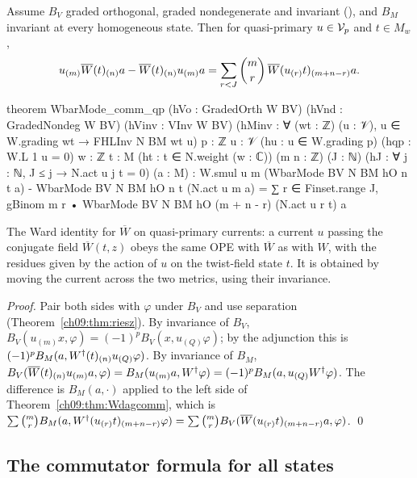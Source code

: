 \begin{theorem}\label{ch09:thm:Wbarcommqp}
Assume $B_V$ graded orthogonal, graded nondegenerate and invariant (), and $B_M$
invariant at every homogeneous state. Then for quasi-primary $u\in\mathcal{V}_p$ and $t\in M_w$,
\begin{equation*}
u_{(m)}\overline{W}(t)_{(n)}a-\overline{W}(t)_{(n)}u_{(m)}a=\sum_{r<J}\binom mr\,\overline{W}(u_{(r)}t)_{(m+n-r)}a .
\end{equation*}
\end{theorem}
\begin{leancode}
theorem WbarMode_comm_qp (hVo : GradedOrth W BV) (hVnd : GradedNondeg W BV) (hVinv : VInv W BV)
    (hMinv : ∀ (wt : ℤ) (u : 𝒱), u ∈ W.grading wt → FHLInv N BM wt u)
    {p : ℤ} {u : 𝒱} (hu : u ∈ W.grading p) (hqp : W.L 1 u = 0) {w : ℤ} {t : M}
    (ht : t ∈ N.weight (w : ℂ)) (m n : ℤ) (J : ℕ) (hJ : ∀ j : ℕ, J ≤ j → N.act u j t = 0)
    (a : M) :
    W.smul u m (WbarMode BV N BM hO n t a) - WbarMode BV N BM hO n t (N.act u m a)
      = ∑ r ∈ Finset.range J, gBinom m r • WbarMode BV N BM hO (m + n - r) (N.act u r t) a
\end{leancode}
\begin{physics}
The Ward identity for $\overline W$ on quasi-primary currents: a current $u$ passing the conjugate field $\overline W(t,z)$ obeys the same OPE with $\overline W$ as with $W$, with the residues given by the action of $u$ on the twist-field state $t$. It is obtained by moving the current across the two metrics, using their invariance.
\end{physics}

\noindent\emph{Proof.} Pair both sides with $\varphi$ under $B_V$ and use separation
(Theorem~\ref{ch09:thm:riesz}). By invariance of $B_V$, $B_V(u_{(m)}x,\varphi)=(-1)^pB_V(x,u_{(Q)}\varphi)$;
by the adjunction this is $(-1)^pB_M(a,W^{\dagger}(t)_{(n)}u_{(Q)}\varphi)$. By invariance of $B_M$,
$B_V(\overline{W}(t)_{(n)}u_{(m)}a,\varphi)=B_M(u_{(m)}a,W^{\dagger}\varphi)=(-1)^pB_M(a,u_{(Q)}W^{\dagger}\varphi)$.
The difference is $B_M(a,\cdot)$ applied to the left side of Theorem~\ref{ch09:thm:Wdagcomm}, which is
$\sum\binom mr B_M(a,W^{\dagger}(u_{(r)}t)_{(m+n-r)}\varphi)=\sum\binom mrB_V(\overline{W}(u_{(r)}t)_{(m+n-r)}a,\varphi)$. \qed

\subsection{The commutator formula for all states}


